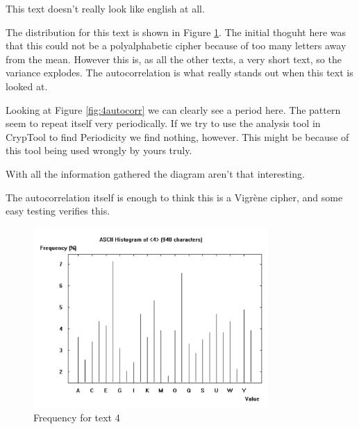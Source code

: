 This text doesn't really look like english at all.

The distribution for this text is shown in Figure \ref{fig:4freq}.
The initial thoguht here was that this could not be a polyalphabetic cipher because of too many letters away from the mean.
However this is, as all the other texts, a very short text, so the variance explodes.
The autocorrelation is what really stands out when this text is looked at.

Looking at Figure \ref{fig:4autocorr} we can clearly see a period here.
The pattern seem to repeat itself very periodically.
If we try to use the analysis tool in CrypTool to find Periodicity we find nothing, however.
This might be because of this tool being used wrongly by yours truly.

With all the information gathered the diagram aren't that interesting.

The autocorrelation itself is enough to think this is a Vigrène cipher, and some easy testing verifies this.

\begin{figure}[ht!]
    \begin{center}
        \includegraphics[width=0.8\textwidth]{assets/4_frequency.png}
        \caption{Frequency for text 4}
        \label{fig:4freq}
    \end{center}
\end{figure}

